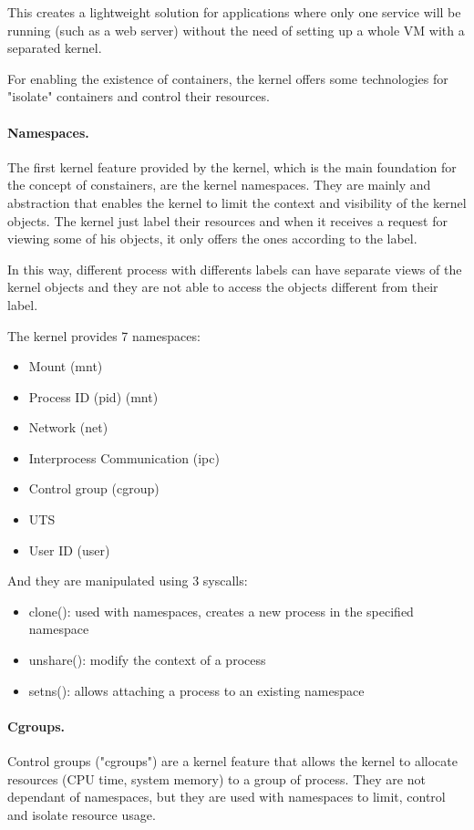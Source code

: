 This creates a lightweight solution for applications where only one service will be running (such as a web server) without the need of setting up a whole VM with a separated kernel.

For enabling the existence of containers, the kernel offers some technologies for "isolate" containers and control their resources. 

\paragraph{Namespaces.} The first kernel feature provided by the kernel, which is the main foundation for the concept of constainers, are the kernel namespaces.
They are mainly and abstraction that enables the kernel to limit the context and visibility of the kernel objects. The kernel just label their resources and when it receives a request for viewing some of his objects, it only offers the ones according to the label. 

In this way, different process with differents labels can have separate views of the kernel objects and they are not able to access the objects different from their label.

The kernel provides 7 namespaces:
\begin{itemize}
	\item{Mount (mnt)}
	\item{Process ID (pid) (mnt)}
	\item{Network (net)}
	\item{Interprocess Communication (ipc)}
	\item{Control group (cgroup)}
	\item{UTS}
	\item{User ID (user)}
\end{itemize}

And they are manipulated using 3 syscalls:
\begin{itemize}
	\item{clone(): used with namespaces, creates a new process in the specified namespace}
	\item{unshare(): modify the context of a process}
	\item{setns(): allows attaching a process to an existing namespace}
\end{itemize}

\paragraph{Cgroups.} Control groups ("cgroups") are a kernel feature that allows the kernel to allocate resources (CPU time, system memory) to a group of process. They are not dependant of namespaces, but they are used with namespaces to limit, control and isolate resource usage.


